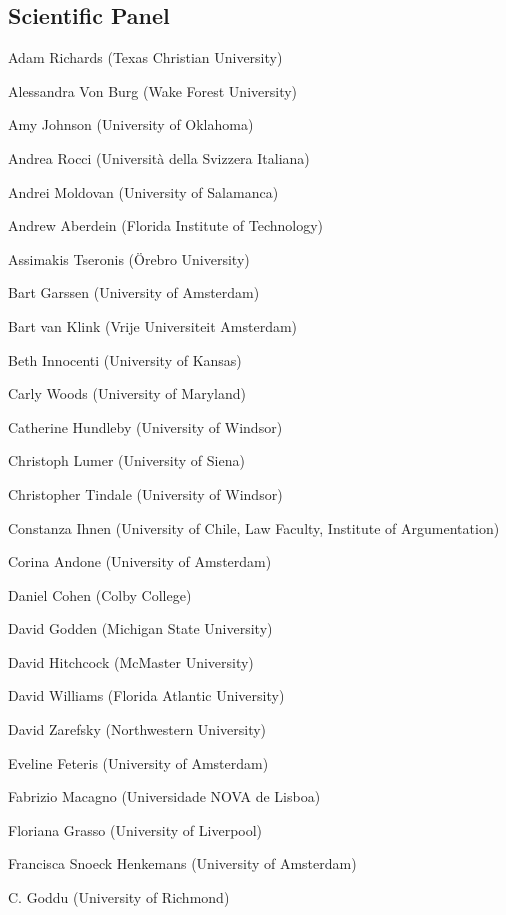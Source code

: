 	\subsection*{Scientific Panel}
	\begin{compactitem}[]
		\item[] Adam Richards (Texas Christian University)
		\item[] Alessandra Von Burg (Wake Forest University)
		\item[] Amy Johnson (University of Oklahoma)
		\item[] Andrea Rocci (Università della Svizzera Italiana)
		\item[] Andrei Moldovan (University of Salamanca)
		\item[] Andrew Aberdein (Florida Institute of Technology)
		\item[] Assimakis Tseronis (Örebro University)
		\item[] Bart Garssen (University of Amsterdam)
		\item[] Bart van Klink (Vrije Universiteit Amsterdam)
		\item[] Beth Innocenti (University of Kansas)
		\item[] Carly Woods (University of Maryland)
		\item[] Catherine Hundleby (University of Windsor)
		\item[] Christoph Lumer (University of Siena)
		\item[] Christopher Tindale (University of Windsor)
		\item[] Constanza Ihnen (University of Chile, Law Faculty, Institute of Argumentation)
		\item[] Corina Andone (University of Amsterdam)
		\item[] Daniel Cohen (Colby College)
		\item[] David Godden (Michigan State University)
		\item[] David Hitchcock (McMaster University)
		\item[] David Williams (Florida Atlantic University)
		\item[] David Zarefsky (Northwestern University)
		\item[] Eveline Feteris (University of Amsterdam)
		\item[] Fabrizio Macagno (Universidade NOVA de Lisboa)
		\item[] Floriana Grasso (University of Liverpool)
		\item[] Francisca Snoeck Henkemans (University of Amsterdam)
		\item[] C. Goddu (University of Richmond)

\end{compactitem}
